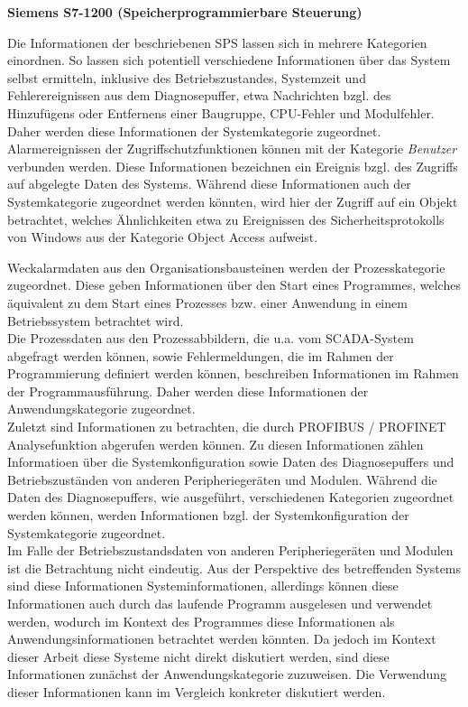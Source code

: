\textbf{Siemens S7-1200 (Speicherprogrammierbare Steuerung)}

Die Informationen der beschriebenen SPS lassen sich in mehrere Kategorien einordnen. So lassen sich potentiell verschiedene Informationen über das System selbst ermitteln, inklusive des Betriebszustandes, Systemzeit und Fehlerereignissen aus dem Diagnosepuffer, etwa Nachrichten bzgl. des Hinzufügens oder Entfernens einer Baugruppe, CPU-Fehler und Modulfehler. Daher werden diese Informationen der Systemkategorie zugeordnet. \\

Alarmereignissen der Zugriffschutzfunktionen können mit der Kategorie \textit{Benutzer} verbunden werden. Diese Informationen bezeichnen ein Ereignis bzgl. des Zugriffs auf abgelegte Daten des Systems. Während diese Informationen auch der Systemkategorie zugeordnet werden könnten, wird hier der Zugriff auf ein \glqq Objekt\grqq{} betrachtet, welches Ähnlichkeiten etwa zu Ereignissen des Sicherheitsprotokolls von Windows aus der Kategorie \glqq Object Access\grqq{} aufweist. 

Weckalarmdaten aus den Organisationsbausteinen werden der Prozesskategorie zugeordnet. Diese geben Informationen über den Start eines Programmes, welches äquivalent zu dem Start eines Prozesses bzw. einer Anwendung in einem Betriebssystem betrachtet wird.\\

Die Prozessdaten aus den Prozessabbildern, die u.a. vom SCADA-System abgefragt werden können, sowie Fehlermeldungen, die im Rahmen der Programmierung definiert werden können, beschreiben Informationen im Rahmen der Programmausführung. Daher werden diese Informationen der Anwendungskategorie zugeordnet. \\

Zuletzt sind Informationen zu betrachten, die durch PROFIBUS / PROFINET Analysefunktion abgerufen werden können. Zu diesen Informationen zählen Informatioen über die Systemkonfiguration sowie Daten des Diagnosepuffers und Betriebszuständen von anderen Peripheriegeräten und Modulen. Während die Daten des Diagnosepuffers, wie ausgeführt, verschiedenen Kategorien zugeordnet werden können, werden Informationen bzgl. der Systemkonfiguration der Systemkategorie zugeordnet.\\

Im Falle der Betriebszustandsdaten von anderen Peripheriegeräten und Modulen ist die Betrachtung nicht eindeutig. Aus der Perspektive des betreffenden Systems sind diese Informationen Systeminformationen, allerdings können diese Informationen auch durch das laufende Programm ausgelesen und verwendet werden, wodurch im Kontext des Programmes diese Informationen als Anwendungsinformationen betrachtet werden könnten. Da jedoch im Kontext dieser Arbeit diese Systeme nicht direkt diskutiert werden, sind diese Informationen zunächst der Anwendungskategorie zuzuweisen. Die Verwendung dieser Informationen kann im Vergleich konkreter diskutiert werden. \\

